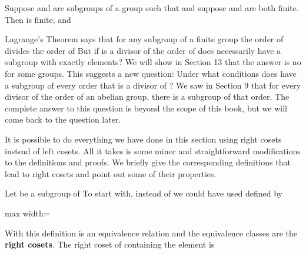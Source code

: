 \documentclass[11pt,oneside]{article}
\begin{document}
\BookNarrativetrue

\begin{BookBody}

 Suppose  and  are subgroups of a group  such that  and suppose  and  are both finite. Then  is finite, and 

Lagrange’s Theorem says that for any subgroup  of a finite group  the order of  divides the order of  But if  is a divisor of the order of  does  necessarily have a subgroup with exactly  elements? We will show in Section 13 that the answer is no for some groups. This suggests a new question: Under what conditions does  have a subgroup of every order  that is a divisor of ? We saw in Section 9 that for every divisor of the order of an abelian group, there is a subgroup of that order. The complete answer to this question is beyond the scope of this book, but we will come back to the question later.


\noindent It is possible to do everything we have done in this section using right cosets instead of left cosets. All it takes is some minor and straightforward modifications to the definitions and proofs. We briefly give the corresponding definitions that lead to right cosets and point out some of their properties.

Let  be a subgroup of  To start with, instead of  we could have used  defined by

\begin{center}\begin{adjustbox}{max width=\linewidth}\end{adjustbox}\end{center}

\noindent With this definition is an equivalence relation and the equivalence classes are the \textbf{right cosets}. The right coset of  containing the element  is


\end{BookBody}
\end{document}
